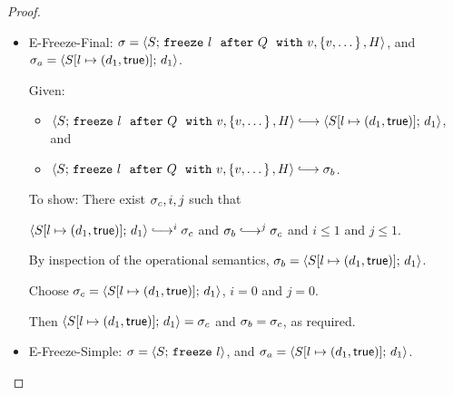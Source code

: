 \begin{proof}
\begin{itemize}
\begin{itemize}
\begin{enumerate}
          The proof is as follows:

          From the premises of {\sc E-Spawn-Handler}, \\
          $S(l) = \state{d_1}{\status_1}$ and
          $d_2 \userleq d_1$ and 
          $d_2 \notin H$ and
          $d_2 \in Q$.

          Hence, by {\sc E-Spawn-Handler}, \\
          $\config{S'}{\freezeafterfull{l}{Q}{\lam{x}{e_0}}{\setof{e',
              \dots}}{H}} \parstepsto \\
          \config{S'}{\freezeafterfull{l}{Q}{\lam{x}{e_0}}{\setof{\subst{e_0}{x}{d_2}, e',
                \dots}}{\{d_2\}\cup H}}$.

          Hence $\conf_b \parstepsto \conf_c$.
        \end{enumerate}

      \end{itemize}

    \item {\sc E-Freeze-Final}: $\sigma =
      \langle S;\, \mbox{\texttt{freeze}}~l~~{\mbox{\texttt{after}}}~Q~~{\mbox{\texttt{with}}}~v, \left\{v, \dots\right\}, H \rangle$, and
      $\sigma_a = \langle S[l \mapsto (d_1, \textsf{true})];\, d_1 \rangle$.

      Given:
      \begin{itemize}
      \item $\config{S}{\freezeafterfull{l}{Q}{v}{\setof{v, \dots}}{H}}
        \parstepsto \config{\extS{S}{l}{d_1}{\frozentrue}}{d_1}$, and
      \item $\config{S}{\freezeafterfull{l}{Q}{v}{\setof{v, \dots}}{H}} \parstepsto \conf_b$.
      \end{itemize}

      To show: There exist $\sigma_c, i, j$ such that

      $\config{\extS{S}{l}{d_1}{\frozentrue}}{d_1} \parstepsto^i
      \conf_c$ and $\conf_b \parstepsto^j \conf_c$ and $i \leq 1$ and
      $j \leq 1$.

      By inspection of the operational semantics, $\sigma_b =
      \langle S[l \mapsto (d_1, \textsf{true})];\, d_1 \rangle$.

      Choose $\sigma_c = \langle S[l \mapsto (d_1, \textsf{true})];\, d_1 \rangle$,
      $i = 0$ and $j = 0$.

      Then $\langle S[l \mapsto (d_1, \textsf{true})];\, d_1 \rangle = \sigma_c$ and
      $\sigma_b = \sigma_c$, as required.

    \item {\sc E-Freeze-Simple}: $\sigma =
      \langle S;\, \mbox{\texttt{freeze}}~l \rangle$, and $\sigma_a =
      \langle S[l \mapsto (d_1, \textsf{true})];\, d_1 \rangle$.


\end{itemize}
\end{proof}
